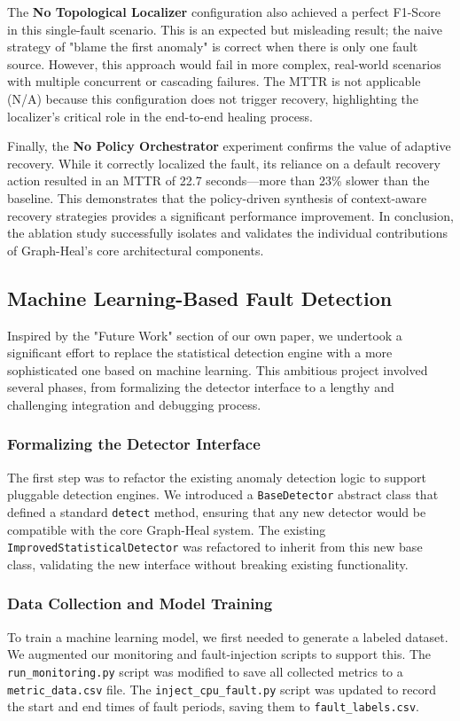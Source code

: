 \documentclass[11pt,conference]{IEEEtran}
\begin{document}
The \textbf{No Topological Localizer} configuration also achieved a perfect F1-Score in this single-fault scenario. This is an expected but misleading result; the naive strategy of "blame the first anomaly" is correct when there is only one fault source. However, this approach would fail in more complex, real-world scenarios with multiple concurrent or cascading failures. The MTTR is not applicable (N/A) because this configuration does not trigger recovery, highlighting the localizer's critical role in the end-to-end healing process.

Finally, the \textbf{No Policy Orchestrator} experiment confirms the value of adaptive recovery. While it correctly localized the fault, its reliance on a default recovery action resulted in an MTTR of 22.7 seconds—more than 23\% slower than the baseline. This demonstrates that the policy-driven synthesis of context-aware recovery strategies provides a significant performance improvement. In conclusion, the ablation study successfully isolates and validates the individual contributions of Graph-Heal's core architectural components.
\subsection{Machine Learning-Based Fault Detection}
Inspired by the "Future Work" section of our own paper, we undertook a significant effort to replace the statistical detection engine with a more sophisticated one based on machine learning. This ambitious project involved several phases, from formalizing the detector interface to a lengthy and challenging integration and debugging process.

\subsubsection{Formalizing the Detector Interface}
The first step was to refactor the existing anomaly detection logic to support pluggable detection engines. We introduced a \texttt{BaseDetector} abstract class that defined a standard \texttt{detect} method, ensuring that any new detector would be compatible with the core Graph-Heal system. The existing \texttt{ImprovedStatisticalDetector} was refactored to inherit from this new base class, validating the new interface without breaking existing functionality.

\subsubsection{Data Collection and Model Training}
To train a machine learning model, we first needed to generate a labeled dataset. We augmented our monitoring and fault-injection scripts to support this. The \texttt{run\_monitoring.py} script was modified to save all collected metrics to a \texttt{metric\_data.csv} file. The \texttt{inject\_cpu\_fault.py} script was updated to record the start and end times of fault periods, saving them to \texttt{fault\_labels.csv}.
\end{document}
